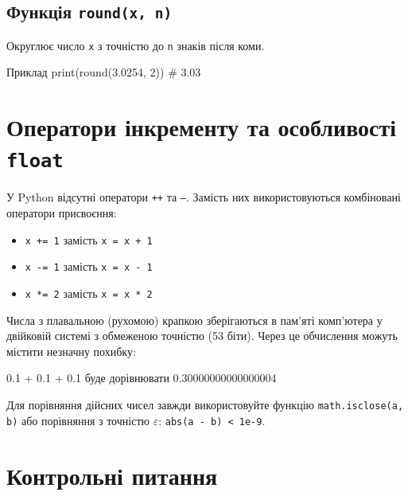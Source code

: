 	\subsection*{Функція \texttt{round(x, n)}}
	Округлює число \texttt{x} з точністю до \texttt{n} знаків після коми.
	\begin{py}{Приклад}
print(round(3.0254, 2))   # 3.03
	\end{py}
	
	
	\section{Оператори інкременту та особливості \texttt{float}}
	
	У Python відсутні оператори \texttt{++} та \texttt{--}. Замість них використовуються комбіновані оператори присвоєння:
	\begin{itemize}
		\item \texttt{x += 1} замість \texttt{x = x + 1}
		\item \texttt{x -= 1} замість \texttt{x = x - 1}
		\item \texttt{x *= 2} замість \texttt{x = x * 2}
	\end{itemize}
	
	\begin{tcolorbox}[colback=yellow!10!white,colframe=orange,title=\textbf{Обережно з дійсними числами (float)!},fonttitle=\sffamily\bfseries]
		Числа з плавальною (рухомою) крапкою зберігаються в пам'яті комп'ютера у двійковій системі з обмеженою точністю (53 біти). Через це обчислення можуть містити незначну похибку:
	
0.1 + 0.1 + 0.1 буде  дорівнювати
0.30000000000000004

		Для порівняння дійсних чисел завжди використовуйте функцію \texttt{math.isclose(a, b)} або порівняння з точністю $\varepsilon$: \texttt{abs(a - b) < 1e-9}.
	\end{tcolorbox}
	
	\vspace{0.3cm}
	
	
	
	\section*{Контрольні питання}
	
